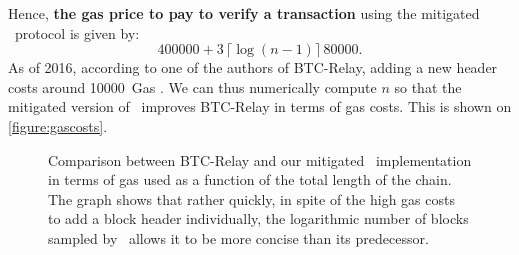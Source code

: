 Hence, \textbf{the gas price to pay to verify a transaction} using the mitigated \FC\ protocol is given by:
\[\num{400000} + 3\,\lceil\log(n-1)\rceil\,\num{80000}.\]
As of 2016, according to one of the authors of BTC-Relay, adding a new header costs around \SI{10000}{Gas} \cite{BTCGas}. We can thus numerically compute \(n\) so that the mitigated version of \FC\ improves BTC-Relay in terms of gas costs. This is shown on \autoref{figure:gascosts}.

\begin{figure}[ht]
    \centering
    \caption{Comparison between BTC-Relay and our mitigated \FC\ implementation in terms of gas used as a function of the total length of the chain. The graph shows that rather quickly, in spite of the high gas costs to add a block header individually, the logarithmic number of blocks sampled by \FC\ allows it to be more concise than its predecessor.}
    \label{figure:gascosts}
\end{figure}